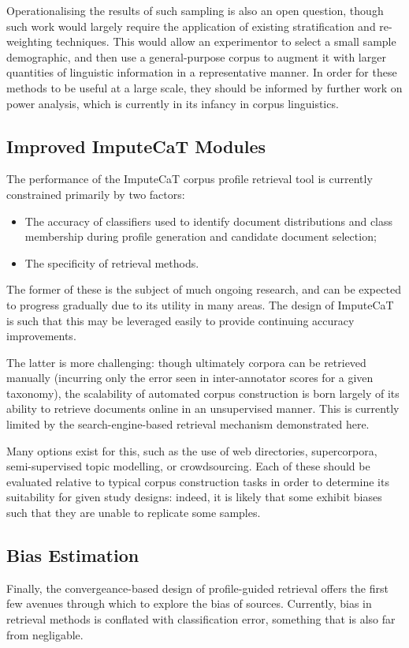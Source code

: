 Operationalising the results of such sampling is also an open question, though such work would largely require the application of existing stratification and re-weighting techniques.  This would allow an experimentor to select a small sample demographic, and then use a general-purpose corpus to augment it with larger quantities of linguistic information in a representative manner.  In order for these methods to be useful at a large scale, they should be informed by further work on power analysis, which is currently in its infancy in corpus linguistics.



\subsection{Improved ImputeCaT Modules}
The performance of the ImputeCaT corpus profile retrieval tool is currently constrained primarily by two factors:

\begin{itemize}
    \item The accuracy of classifiers used to identify document distributions and class membership during profile generation and candidate document selection;
    \item The specificity of retrieval methods.
\end{itemize}

The former of these is the subject of much ongoing research, and can be expected to progress gradually due to its utility in many areas.  The design of ImputeCaT is such that this may be leveraged easily to provide continuing accuracy improvements.

The latter is more challenging: though ultimately corpora can be retrieved manually (incurring only the error seen in inter-annotator scores for a given taxonomy\cite{sharoffs2015}), the scalability of automated corpus construction is born largely of its ability to retrieve documents online in an unsupervised manner.  This is currently limited by the search-engine-based retrieval mechanism demonstrated here.

Many options exist for this, such as the use of web directories, supercorpora, semi-supervised topic modelling, or crowdsourcing.  Each of these should be evaluated relative to typical corpus construction tasks in order to determine its suitability for given study designs: indeed, it is likely that some exhibit biases such that they are unable to replicate some samples.


\subsection{Bias Estimation}
Finally, the convergeance-based design of profile-guided retrieval offers the first few avenues through which to explore the bias of sources.  Currently, bias in retrieval methods is conflated with classification error, something that is also far from negligable.

